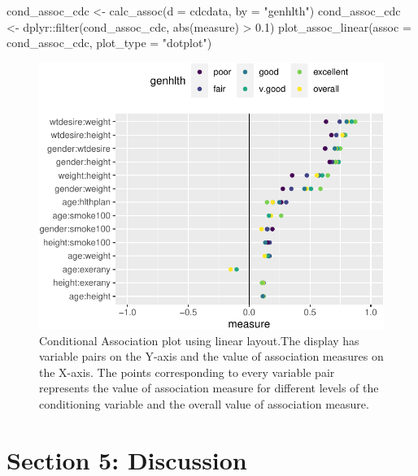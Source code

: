 \begin{Schunk}
\begin{Sinput}
cond_assoc_cdc <- calc_assoc(d = cdcdata, 
                             by = "genhlth")
cond_assoc_cdc <- dplyr::filter(cond_assoc_cdc, abs(measure) > 0.1)
plot_assoc_linear(assoc = cond_assoc_cdc,
                  plot_type = "dotplot")
\end{Sinput}
\begin{figure}

\includegraphics{rj_paper_files/figure-latex/linear-cond-assoc-1} \hfill{}

\caption[Conditional Association plot using linear layout.The display has variable pairs on the Y-axis and the value of association measures on the X-axis]{Conditional Association plot using linear layout.The display has variable pairs on the Y-axis and the value of association measures on the X-axis. The points corresponding to every variable pair represents the value of association measure for different levels of the conditioning variable and the overall value of association measure.}\label{fig:linear-cond-assoc}
\end{figure}
\end{Schunk}

\hypertarget{section-5-discussion}{%
\section{Section 5: Discussion}\label{section-5-discussion}}

